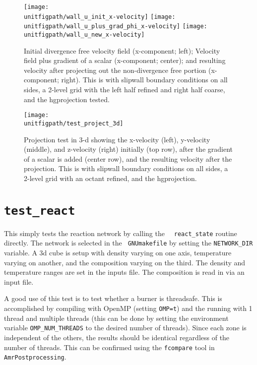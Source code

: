 \begin{figure}[t] 
\centering
\texttt{[image: \\unitfigpath/wall\_u\_init\_x-velocity]} 
\texttt{[image: \\unitfigpath/wall\_u\_plus\_grad\_phi\_x-velocity]} 
\texttt{[image: \\unitfigpath/wall\_u\_new\_x-velocity]} 
%
\caption[Results of 2-d the {\tt test\_projection} unit test]{\label{fig:unit:projtest}
  Initial divergence free velocity field (x-component; left); Velocity
  field plus gradient of a scalar (x-component; center); and resulting
  velocity after projecting out the non-divergence free portion
  (x-component; right).  This is with slipwall boundary conditions on
  all sides, a 2-level grid with the left half refined and right half
  coarse, and the hgprojection tested.}
\end{figure}


\begin{figure}
\centering
\texttt{[image: \\unitfigpath/test\_project\_3d]}
%
\caption[Results of the 3-d {\tt test\_projection} unit test]{\label{fig:unit:projtest3d}
  Projection test in 3-d showing the x-velocity (left), y-velocity
  (middle), and z-velocity (right) initially (top row), after the
  gradient of a scalar is added (center row), and the resulting
  velocity after the projection.  This is with slipwall boundary conditions
  on all sides, a 2-level grid with an octant refined, and the hgprojection.}
\end{figure}

\section{\tt test\_react}

  This simply tests the reaction network by calling the \maestro\ {\tt
  react\_state} routine directly.  The network is selected in the {\tt
  GNUmakefile} by setting the {\tt NETWORK\_DIR} variable.  A 3d cube
  is setup with density varying on one axis, temperature varying on
  another, and the composition varying on the third.  The density and
  temperature ranges are set in the inputs file.  The composition is
  read in via an input file.

  A good use of this test is to test whether a burner is threadsafe.
  This is accomplished by compiling with OpenMP (setting {\tt OMP=t})
  and the running with 1 thread and multiple threads (this can be done
  by setting the environment variable {\tt OMP\_NUM\_THREADS} to the 
  desired number of threads).  Since each zone is independent of the
  others, the results should be identical regardless of the number
  of threads.  This can be confirmed using the {\tt fcompare} tool
  in {\tt AmrPostprocessing}.


